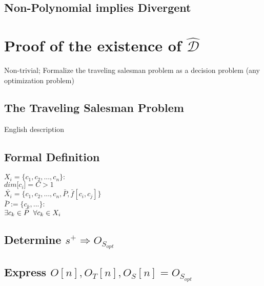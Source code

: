 \documentclass[11pt]{article}
\begin{document}
\subsection{Non-Polynomial implies Divergent}




















\newpage
\section{Proof of the existence of $\hat{\mathcal{D}}$}
Non-trivial; Formalize the traveling salesman problem as a decision problem (any optimization problem)

\subsection{The Traveling Salesman Problem}
English description

\subsection{Formal Definition}
\begin{center}
$
X_i = \{ c_1,c_2,...,c_n \} :
$
\\ \vspace{2mm}
$
dim\lbrack c_i \rbrack = C > 1
$
\\ \vspace{4mm} 
$
\bar{X_i} = \{ c_1,c_2,...,c_n,\bar{P},\bar{f}[c_i,c_j] \}
$
\\ \vspace{2mm}
$
\bar{P} := \{c_k,...\} :
$
\\ \vspace{2mm}
$
\exists c_k \in \bar{P} \hspace{2mm} \forall c_k \in X_i
$
\end{center}

\subsection{Determine $s^+ \Longrightarrow O_{S_{opt}}$}
\subsection{Express $O[n],O_T[n],O_S[n] =  O_{S_{opt}}$}
\end{document}
